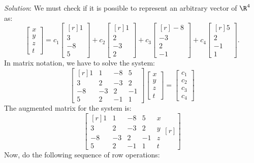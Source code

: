 \documentclass[12pt]{article}
\begin{document}
\emph{Solution}:
We must check if it is possible to represent an arbitrary vector of $\R^4$ as:
\[
\begin{bmatrix}x\\y\\z\\t\end{bmatrix}=
c_1\begin{bmatrix*}[r] 1\\ 3\\ -8\\ 5\end{bmatrix*}
+c_2\begin{bmatrix*}[r] 1\\ 2\\ -3\\ 2\end{bmatrix*}
+c_3\begin{bmatrix*}[r] -8\\ -3\\ 2\\ -1\end{bmatrix*}
+c_4\begin{bmatrix*}[r] 5\\ 2\\ -1\\ 1\end{bmatrix*}.
\]
In matrix notation, we have to solve the system:
\[
\left[\begin{matrix*}[r]
1 & 1 & -8 & 5 \\
3 & 2 & -3 & 2 \\
-8 & -3 & 2 & -1 \\5 & 2 & -1 & 1 
\end{matrix*}\right]
\begin{bmatrix}x\\y\\z\\t\end{bmatrix}=
\begin{bmatrix}c_1\\c_2\\c_3\\c_4\end{bmatrix}
\]
The augmented matrix for the system is:
\[
\left[\begin{matrix*}[r]1 & 1 & -8 & 5 & x\\3 & 2 & -3 & 2 & y\\-8 & -3 & 2 & -1 & z\\5 & 2 & -1 & 1 & t\end{matrix*}[r]\right]
\] 
Now, do the following sequence of row operations:
\end{document}
